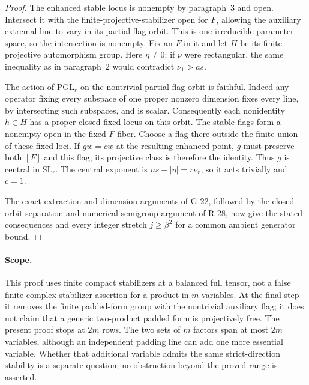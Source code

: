 \begin{proof}
The enhanced stable locus is nonempty by paragraph~3 and open.
Intersect it with the finite-projective-stabilizer open for $F$,
allowing the auxiliary extremal line to vary in its partial
flag orbit. This is one irreducible parameter space, so the
intersection is nonempty. Fix an $F$ in it and let $H$ be its
finite projective automorphism group. Here $\eta\ne0$: if
$\nu$ were rectangular, the same inequality as in paragraph~2
would contradict $\nu_1>as$.

The action of $\mathrm{PGL}_r$ on the nontrivial partial flag
orbit is faithful. Indeed any operator fixing every subspace
of one proper nonzero dimension fixes every line, by intersecting
such subspaces, and is scalar. Consequently each nonidentity
$h\in H$ has a proper closed fixed locus on this orbit. The
stable flags form a nonempty open in the fixed-$F$ fiber.
Choose a flag there outside the finite union of these fixed
loci. If $g w=cw$ at the resulting enhanced point, $g$ must
preserve both $[F]$ and this flag; its projective class is
therefore the identity. Thus $g$ is central in $\mathrm{SL}_r$.
The central exponent is $ns-|\eta|=r\nu_r$, so it acts
trivially and $c=1$.

The exact extraction and dimension arguments of G-22, followed
by the closed-orbit separation and numerical-semigroup argument
of R-28, now give the stated consequences and every integer
stretch $j\geq\beta^2$ for a common ambient generator bound.
\end{proof}

\paragraph{Scope.}
This proof uses finite compact stabilizers at a balanced full
tensor, not a false finite-complex-stabilizer assertion for a
product in $m$ variables. At the final step it removes the
finite padded-form group with the nontrivial auxiliary flag;
it does not claim that a generic two-product padded form is
projectively free. The present proof stops at $2m$ rows. The two sets of $m$
factors span at most $2m$ variables, although an independent
padding line can add one more essential variable. Whether
that additional variable admits the same strict-direction
stability is a separate question; no obstruction beyond the
proved range is asserted.
